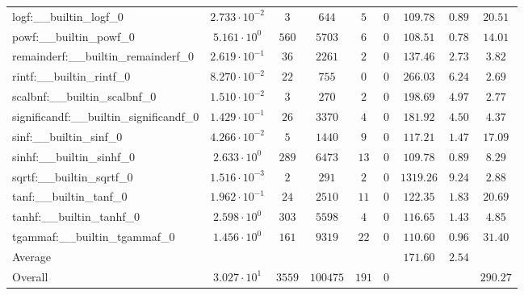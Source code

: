 \begin{tabular}{|l|c|c|c|c|c|c|c|c|}
logf:\_\_builtin\_logf\_0                 & $ 2.733 \cdot 10^{-2} $ & $ 3      $ & $ 644    $ & $ 5   $ & $ 0   $ & $ 109.78      $ & $ 0.89    $ & $ 20.51   $ \\
powf:\_\_builtin\_powf\_0                 & $ 5.161 \cdot 10^{0}  $ & $ 560    $ & $ 5703   $ & $ 6   $ & $ 0   $ & $ 108.51      $ & $ 0.78    $ & $ 14.01   $ \\
remainderf:\_\_builtin\_remainderf\_0     & $ 2.619 \cdot 10^{-1} $ & $ 36     $ & $ 2261   $ & $ 2   $ & $ 0   $ & $ 137.46      $ & $ 2.73    $ & $ 3.82    $ \\
rintf:\_\_builtin\_rintf\_0               & $ 8.270 \cdot 10^{-2} $ & $ 22     $ & $ 755    $ & $ 0   $ & $ 0   $ & $ 266.03      $ & $ 6.24    $ & $ 2.69    $ \\
scalbnf:\_\_builtin\_scalbnf\_0           & $ 1.510 \cdot 10^{-2} $ & $ 3      $ & $ 270    $ & $ 2   $ & $ 0   $ & $ 198.69      $ & $ 4.97    $ & $ 2.77    $ \\
significandf:\_\_builtin\_significandf\_0 & $ 1.429 \cdot 10^{-1} $ & $ 26     $ & $ 3370   $ & $ 4   $ & $ 0   $ & $ 181.92      $ & $ 4.50    $ & $ 4.37    $ \\
sinf:\_\_builtin\_sinf\_0                 & $ 4.266 \cdot 10^{-2} $ & $ 5      $ & $ 1440   $ & $ 9   $ & $ 0   $ & $ 117.21      $ & $ 1.47    $ & $ 17.09   $ \\
sinhf:\_\_builtin\_sinhf\_0               & $ 2.633 \cdot 10^{0}  $ & $ 289    $ & $ 6473   $ & $ 13  $ & $ 0   $ & $ 109.78      $ & $ 0.89    $ & $ 8.29    $ \\
sqrtf:\_\_builtin\_sqrtf\_0               & $ 1.516 \cdot 10^{-3} $ & $ 2      $ & $ 291    $ & $ 2   $ & $ 0   $ & $ 1319.26     $ & $ 9.24    $ & $ 2.88    $ \\
tanf:\_\_builtin\_tanf\_0                 & $ 1.962 \cdot 10^{-1} $ & $ 24     $ & $ 2510   $ & $ 11  $ & $ 0   $ & $ 122.35      $ & $ 1.83    $ & $ 20.69   $ \\
tanhf:\_\_builtin\_tanhf\_0               & $ 2.598 \cdot 10^{0}  $ & $ 303    $ & $ 5598   $ & $ 4   $ & $ 0   $ & $ 116.65      $ & $ 1.43    $ & $ 4.85    $ \\
tgammaf:\_\_builtin\_tgammaf\_0           & $ 1.456 \cdot 10^{0}  $ & $ 161    $ & $ 9319   $ & $ 22  $ & $ 0   $ & $ 110.60      $ & $ 0.96    $ & $ 31.40   $ \\
\hline
Average                                   & $                     $ & $        $ & $        $ & $     $ & $     $ & $ 171.60      $ & $ 2.54    $ & $         $ \\
\hline
Overall                                   & $ 3.027 \cdot 10^{1}  $ & $ 3559   $ & $ 100475 $ & $ 191 $ & $ 0   $ & $             $ & $         $ & $ 290.27  $ \\
\hline
\end{tabular}
